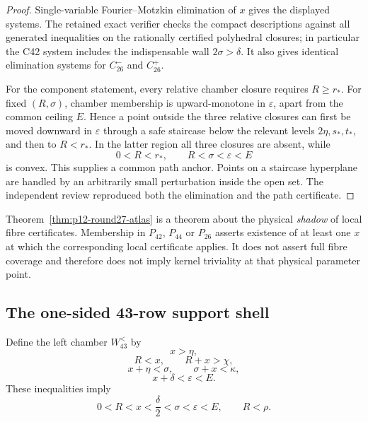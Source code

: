 \begin{proof}
Single-variable Fourier--Motzkin elimination of \(x\) gives the displayed
systems. The retained exact verifier checks the compact descriptions against
all generated inequalities on the rationally certified polyhedral closures;
in particular the C42 system includes the indispensable wall
\(2\sigma>\delta\). It also gives identical elimination systems for
\(C_{26}^{-}\) and \(C_{26}^{+}\).

For the component statement, every relative chamber closure requires
\(R\ge r_*\). For fixed \((R,\sigma)\), chamber membership is upward-monotone
in \(\varepsilon\), apart from the common ceiling \(E\). Hence a point outside
the three relative closures can first be moved downward in \(\varepsilon\)
through a safe staircase below the relevant levels \(2\eta,s_*,t_*\), and
then to \(R<r_*\). In the latter region all three closures are absent, while
\[
0<R<r_*,\qquad R<\sigma<\varepsilon<E
\]
is convex. This supplies a common path anchor. Points on a staircase
hyperplane are handled by an arbitrarily small perturbation inside the open
set. The independent review reproduced both the elimination and the path
certificate.
\end{proof}

\begin{remark}
Theorem~\ref{thm:p12-round27-atlas} is a theorem about the physical
\emph{shadow} of local fibre certificates. Membership in \(P_{42}\),
\(P_{44}\) or \(P_{26}\) asserts existence of at least one \(x\) at which the
corresponding local certificate applies. It does not assert full fibre
coverage and therefore does not imply kernel triviality at that physical
parameter point.
\end{remark}

\subsection{The one-sided 43-row support shell}

Define the left chamber \(W_{43}^{<}\) by
\[
x>\eta,
\]
\[
R<x,
\qquad
R+x>\chi,
\]
\[
x+\eta<\sigma,
\qquad
\sigma+x<\kappa,
\]
\[
x+\delta<\varepsilon<E.
\]
These inequalities imply
\[
0<R<x<\frac\delta2<\sigma<\varepsilon<E,
\qquad
R<\rho.
\]

